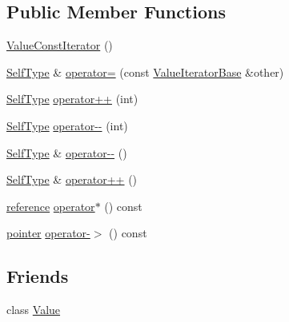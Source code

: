\subsection*{Public Member Functions}
\begin{DoxyCompactItemize}
\item 
\hyperlink{class_json_1_1_value_const_iterator_a1b10a46f1606421b0663492a5f9a2aad}{Value\-Const\-Iterator} ()
\item 
\hyperlink{class_json_1_1_value_iterator_base_a9d2a940d03ea06d20d972f41a89149ee}{Self\-Type} \& \hyperlink{class_json_1_1_value_const_iterator_ad1b1c11f8d7fb22d4d3c231915f2b15b}{operator=} (const \hyperlink{class_json_1_1_value_iterator_base}{Value\-Iterator\-Base} \&other)
\item 
\hyperlink{class_json_1_1_value_iterator_base_a9d2a940d03ea06d20d972f41a89149ee}{Self\-Type} \hyperlink{class_json_1_1_value_const_iterator_ab3f0c2edbfc8f7d60645f3d597d05e28}{operator++} (int)
\item 
\hyperlink{class_json_1_1_value_iterator_base_a9d2a940d03ea06d20d972f41a89149ee}{Self\-Type} \hyperlink{class_json_1_1_value_const_iterator_a94935961e9331c6f7b907b05ec8df75e}{operator-\/-\/} (int)
\item 
\hyperlink{class_json_1_1_value_iterator_base_a9d2a940d03ea06d20d972f41a89149ee}{Self\-Type} \& \hyperlink{class_json_1_1_value_const_iterator_a31415e44e44e56fb2bfda7e8bb784646}{operator-\/-\/} ()
\item 
\hyperlink{class_json_1_1_value_iterator_base_a9d2a940d03ea06d20d972f41a89149ee}{Self\-Type} \& \hyperlink{class_json_1_1_value_const_iterator_a2cfe2f7a94a688186efdafb1b181c319}{operator++} ()
\item 
\hyperlink{class_json_1_1_value_const_iterator_aa9b05c6a37cd352ea1ee6e13b816f709}{reference} \hyperlink{class_json_1_1_value_const_iterator_aeb44153d71c61ac9397a84d5ecc244c5}{operator$\ast$} () const 
\item 
\hyperlink{class_json_1_1_value_const_iterator_a400136bd8bc09e9fddec0785fa2cff14}{pointer} \hyperlink{class_json_1_1_value_const_iterator_ac493d31c8eede8af10b71415fe8e624b}{operator-\/$>$} () const 
\end{DoxyCompactItemize}
\subsection*{Friends}
\begin{DoxyCompactItemize}
\item 
class \hyperlink{class_json_1_1_value_const_iterator_aeceedf6e1a7d48a588516ce2b1983d6f}{Value}
\end{DoxyCompactItemize}
